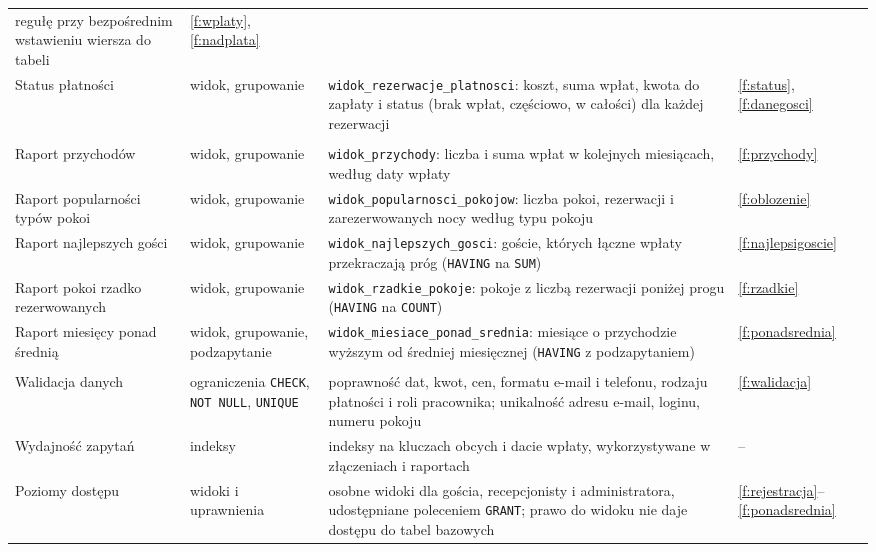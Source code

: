 \documentclass[12pt,a4paper]{article}
\newcommand{\us}{\_\allowbreak}
\begin{document}
\begin{longtable}{>{\raggedright\arraybackslash}p{4.5cm}
                  >{\raggedright\arraybackslash}p{3cm}
                  >{\raggedright\arraybackslash}p{5.5cm}
                  p{1.5cm}}
    regułę przy bezpośrednim wstawieniu wiersza do tabeli
  & \ref{f:wplaty}, \ref{f:nadplata} \\
Status płatności & widok, grupowanie
  & \texttt{widok\us rezerwacje\us platnosci}: koszt, suma wpłat, kwota
    do zapłaty i status (brak wpłat, częściowo, w całości) dla każdej
    rezerwacji
  & \ref{f:status}, \ref{f:danegosci} \\
\midrule
\multicolumn{4}{l}{\textit{Wersja podstawowa -- raporty}} \\
\midrule
Raport przychodów & widok, grupowanie
  & \texttt{widok\us przychody}: liczba i suma wpłat w kolejnych
    miesiącach, według daty wpłaty
  & \ref{f:przychody} \\
Raport popularności typów pokoi & widok, grupowanie
  & \texttt{widok\us popularnosci\us pokojow}: liczba pokoi, rezerwacji
    i zarezerwowanych nocy według typu pokoju
  & \ref{f:oblozenie} \\
Raport najlepszych gości & widok, grupowanie
  & \texttt{widok\us najlepszych\us gosci}: goście, których łączne
    wpłaty przekraczają próg (\texttt{HAVING} na \texttt{SUM})
  & \ref{f:najlepsigoscie} \\
Raport pokoi rzadko rezerwowanych & widok, grupowanie
  & \texttt{widok\us rzadkie\us pokoje}: pokoje z liczbą rezerwacji
    poniżej progu (\texttt{HAVING} na \texttt{COUNT})
  & \ref{f:rzadkie} \\
Raport miesięcy ponad średnią & widok, grupowanie, podzapytanie
  & \texttt{widok\us miesiace\us ponad\us srednia}: miesiące
    o przychodzie wyższym od średniej miesięcznej
    (\texttt{HAVING} z podzapytaniem)
  & \ref{f:ponadsrednia} \\
\midrule
\multicolumn{4}{l}{\textit{Wersja podstawowa -- walidacja i dostęp}} \\
\midrule
Walidacja danych & ograniczenia \texttt{CHECK}, \texttt{NOT NULL},
                   \texttt{UNIQUE}
  & poprawność dat, kwot, cen, formatu e-mail i telefonu, rodzaju
    płatności i roli pracownika; unikalność adresu e-mail, loginu,
    numeru pokoju
  & \ref{f:walidacja} \\
Wydajność zapytań & indeksy
  & indeksy na kluczach obcych i dacie wpłaty, wykorzystywane
    w złączeniach i raportach
  & -- \\
Poziomy dostępu & widoki i uprawnienia
  & osobne widoki dla gościa, recepcjonisty i administratora,
    udostępniane poleceniem \texttt{GRANT}; prawo do widoku
    nie daje dostępu do tabel bazowych
  & \ref{f:rejestracja}--\ref{f:ponadsrednia} \\


\end{longtable}
\end{document}
